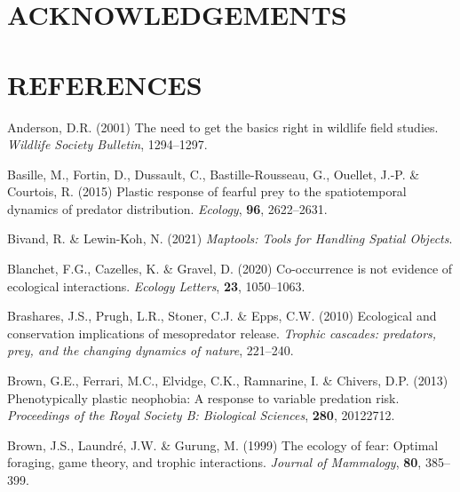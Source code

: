 \documentclass[]{elsarticle} %
\begin{document}
\newpage

\hypertarget{acknowledgements}{%
\section*{ACKNOWLEDGEMENTS}\label{acknowledgements}}

\newpage

\hypertarget{references}{%
\section*{REFERENCES}\label{references}}

\hypertarget{refs}{}
\leavevmode\hypertarget{ref-anderson2001need}{}%
Anderson, D.R. (2001) The need to get the basics right in wildlife field studies. \emph{Wildlife Society Bulletin}, 1294--1297.

\leavevmode\hypertarget{ref-basille2015plastic}{}%
Basille, M., Fortin, D., Dussault, C., Bastille-Rousseau, G., Ouellet, J.-P. \& Courtois, R. (2015) Plastic response of fearful prey to the spatiotemporal dynamics of predator distribution. \emph{Ecology}, \textbf{96}, 2622--2631.

\leavevmode\hypertarget{ref-maptools}{}%
Bivand, R. \& Lewin-Koh, N. (2021) \emph{Maptools: Tools for Handling Spatial Objects}.

\leavevmode\hypertarget{ref-guillaume2020co}{}%
Blanchet, F.G., Cazelles, K. \& Gravel, D. (2020) Co-occurrence is not evidence of ecological interactions. \emph{Ecology Letters}, \textbf{23}, 1050--1063.

\leavevmode\hypertarget{ref-brashares2010ecological}{}%
Brashares, J.S., Prugh, L.R., Stoner, C.J. \& Epps, C.W. (2010) Ecological and conservation implications of mesopredator release. \emph{Trophic cascades: predators, prey, and the changing dynamics of nature}, 221--240.

\leavevmode\hypertarget{ref-brown2013phenotypically}{}%
Brown, G.E., Ferrari, M.C., Elvidge, C.K., Ramnarine, I. \& Chivers, D.P. (2013) Phenotypically plastic neophobia: A response to variable predation risk. \emph{Proceedings of the Royal Society B: Biological Sciences}, \textbf{280}, 20122712.

\leavevmode\hypertarget{ref-brown1999ecology}{}%
Brown, J.S., Laundré, J.W. \& Gurung, M. (1999) The ecology of fear: Optimal foraging, game theory, and trophic interactions. \emph{Journal of Mammalogy}, \textbf{80}, 385--399.
\end{document}
